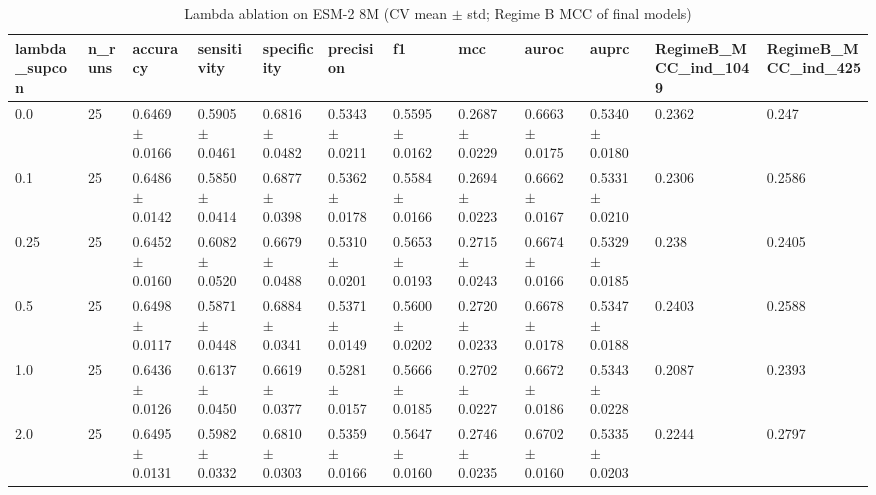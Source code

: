 \begin{table}[ht]
\centering\small
\caption{Lambda ablation on ESM-2 8M (CV mean $\pm$ std; Regime B MCC of final models)}
\label{tab:T5_4_lambda_ablation}
\begin{tabular}{llllllllllll}
\hline
lambda\_supcon & n\_runs & accuracy & sensitivity & specificity & precision & f1 & mcc & auroc & auprc & RegimeB\_MCC\_ind\_1049 & RegimeB\_MCC\_ind\_425 \\
\hline
0.0 & 25 & 0.6469 $\pm$ 0.0166 & 0.5905 $\pm$ 0.0461 & 0.6816 $\pm$ 0.0482 & 0.5343 $\pm$ 0.0211 & 0.5595 $\pm$ 0.0162 & 0.2687 $\pm$ 0.0229 & 0.6663 $\pm$ 0.0175 & 0.5340 $\pm$ 0.0180 & 0.2362 & 0.247 \\
0.1 & 25 & 0.6486 $\pm$ 0.0142 & 0.5850 $\pm$ 0.0414 & 0.6877 $\pm$ 0.0398 & 0.5362 $\pm$ 0.0178 & 0.5584 $\pm$ 0.0166 & 0.2694 $\pm$ 0.0223 & 0.6662 $\pm$ 0.0167 & 0.5331 $\pm$ 0.0210 & 0.2306 & 0.2586 \\
0.25 & 25 & 0.6452 $\pm$ 0.0160 & 0.6082 $\pm$ 0.0520 & 0.6679 $\pm$ 0.0488 & 0.5310 $\pm$ 0.0201 & 0.5653 $\pm$ 0.0193 & 0.2715 $\pm$ 0.0243 & 0.6674 $\pm$ 0.0166 & 0.5329 $\pm$ 0.0185 & 0.238 & 0.2405 \\
0.5 & 25 & 0.6498 $\pm$ 0.0117 & 0.5871 $\pm$ 0.0448 & 0.6884 $\pm$ 0.0341 & 0.5371 $\pm$ 0.0149 & 0.5600 $\pm$ 0.0202 & 0.2720 $\pm$ 0.0233 & 0.6678 $\pm$ 0.0178 & 0.5347 $\pm$ 0.0188 & 0.2403 & 0.2588 \\
1.0 & 25 & 0.6436 $\pm$ 0.0126 & 0.6137 $\pm$ 0.0450 & 0.6619 $\pm$ 0.0377 & 0.5281 $\pm$ 0.0157 & 0.5666 $\pm$ 0.0185 & 0.2702 $\pm$ 0.0227 & 0.6672 $\pm$ 0.0186 & 0.5343 $\pm$ 0.0228 & 0.2087 & 0.2393 \\
2.0 & 25 & 0.6495 $\pm$ 0.0131 & 0.5982 $\pm$ 0.0332 & 0.6810 $\pm$ 0.0303 & 0.5359 $\pm$ 0.0166 & 0.5647 $\pm$ 0.0160 & 0.2746 $\pm$ 0.0235 & 0.6702 $\pm$ 0.0160 & 0.5335 $\pm$ 0.0203 & 0.2244 & 0.2797 \\
\hline
\end{tabular}
\end{table}
